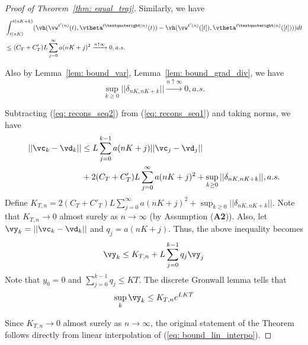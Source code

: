\documentclass{article}
\def\lemref#1{Lemma~\ref{#1}}
\def\thmref#1{Theorem~\ref{#1}}
\begin{document}
\begin{proof}[Proof of \thmref{thm: equal_traj}]
		Similarly, we have
		\begin{equation}
		\begin{split}
		&\int_{t(nK)}^{t(nK+k)}(\vh( \vw^{t'(n)}(t),\vtheta^{t’(n)}(t))-\vh( \vw^{t'(n)}([t]),  \vtheta^{t’(n)}([t])))dt\\
		&\leq (C_T+C'_T) L\sum_{j=0}^{\infty} a(nK+j) ^2   \xrightarrow{n \uparrow \infty }0, a.s.
		\end{split}
		\end{equation}
		
		
		
		Also by \lemref{lem: bound_var}, \lemref{lem: bound_grad_div}, we have
		\begin{equation}
		\sup_{k\geq 0}||\delta_{nK,nK+k}||\xrightarrow{n \uparrow \infty }0, a.s.
		\end{equation}
		
		Subtracting (\ref{eq: recons_seq2}) from (\ref{eq: recons_seq1}) and taking norms, we have
		\begin{equation}
		\begin{split}
		||\vc_k-\vd_k|| &\leq L \sum_{j=0}^{k-1} a(nK+j)||\vc_j-\vd_{j}||\\
		&+2(C_T+C'_T) L\sum_{j=0}^{\infty} a(nK+j) ^2+\sup_{k\geq 0}||\delta_{nK,nK+k}||, a.s.
		\end{split}
		\end{equation}
		Define $K_{T,n}=2(C_T+C'_T) L\sum_{j=0}^{\infty} a(nK+j) ^2+\sup_{k\geq 0}||\delta_{nK,nK+k}||$. Note that $K_{T,n}\rightarrow 0$ almost surely as $n\rightarrow \infty$ (by Assumption (\textbf{A2})). Also, let $\vy_k=||\vc_k-\vd_k||$ and $q_j=a(nK+j)$. Thus, the above inequality becomes
		\begin{equation}
		\vy_k\leq K_{T,n}+L\sum_{j=0}^{k-1}q_j\vy_j
		\end{equation}
		Note that $y_0=0$ and $\sum_{j=0}^{k-1}q_j\leq KT$. The discrete Gronwall lemma tells that 
		\begin{equation}
		\label{eq: bound_lin_interpo}
		\sup_k \vy_k\leq  K_{T,n} e^{L KT}
		\end{equation}
		
		Since $K_{T,n}\rightarrow 0$ almost surely as $n\rightarrow \infty$, the original statement of the Theorem follows directly from linear interpolation of (\ref{eq: bound_lin_interpo}).
	\end{proof}
\end{document}
